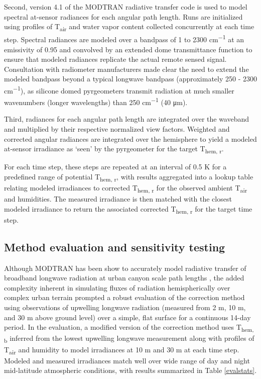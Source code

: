 \begin{bibunit}
Second, version 4.1 of the MODTRAN radiative transfer code \citep{Berk1987} is used to model spectral at-sensor radiances for each angular path length. Runs are initialized using profiles of T\textsubscript{air} and water vapor content collected concurrently at each time step. Spectral radiances are modeled over a bandpass of 1 to 2300 \si{cm^{-1}} at an emissivity of 0.95 and convolved by an extended dome transmittance function to ensure that modeled radiances replicate the actual remote sensed signal. Consultation with radiometer manufacturers made clear the need to extend the modeled bandpass beyond a typical longwave bandpass (approximately 250 - 2300 \si{cm^{-1}}), as silicone domed pyrgeometers transmit radiation at much smaller wavenumbers (longer wavelengths) than 250 \si{cm^{-1}} (40 \si{\micro\meter}).

Third, radiances for each angular path length are integrated over the waveband and multiplied by their respective normalized view factors. Weighted and corrected angular radiances are integrated over the hemisphere to yield a modeled at-sensor irradiance as ‘seen’ by the pyrgeometer for the target T\textsubscript{hem, r}. 

For each time step, these steps are repeated at an interval of 0.5 \si{\kelvin} for a predefined range of potential T\textsubscript{hem, r}, with results aggregated into a lookup table relating modeled irradiances to corrected T\textsubscript{hem, r} for the observed ambient T\textsubscript{air} and humidities. The measured irradiance is then matched with the closest modeled irradiance to return the associated corrected T\textsubscript{hem, r} for the target time step. 

\subsection{Method evaluation and sensitivity testing}

Although MODTRAN has been show to accurately model radiative transfer of broadband longwave radiation at urban canyon scale path lengths \citep{Hoch2005, Hoch2007}, the added complexity inherent in simulating fluxes of radiation hemispherically over complex urban terrain prompted a robust evaluation of the correction method using observations of upwelling longwave radiation (measured from 2 \si{\meter}, 10 \si{\meter}, and 30 \si{\meter} above ground level) over a simple, flat surface for a continuous 14-day period. In the evaluation, a modified version of the correction method uses T\textsubscript{hem, b} inferred from the lowest upwelling longwave measurement along with profiles of T\textsubscript{air} and humidity to model irradiances at 10 \si{\meter} and 30 \si{\meter} at each time step. Modeled and measured irradiances match well over wide range of day and night mid-latitude atmospheric conditions, with results summarized in Table \ref{evalstats}.


\end{bibunit}
